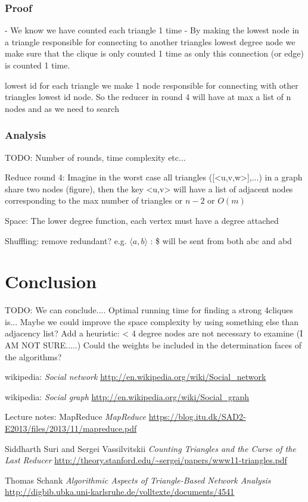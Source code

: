\documentclass{article}
\begin{document}
\subsubsection{Proof}
- We know we have counted each triangle 1 time
- By making the lowest node in a triangle responsible for connecting to another triangles lowest degree node we make sure that the clique is only counted 1 time as only this connection (or edge) is counted 1 time.

lowest id
for each triangle we make 1 node responsible for connecting with other triangles lowest id node. So the reducer in round 4 will have at max a list of n nodes and as we need to search



\subsubsection{Analysis}
TODO: Number of rounds, time complexity etc...

Reduce round 4: Imagine in the worst case all triangles ([<u,v,w>],...) in a graph share two nodes (figure), then the key <u,v> will have a list of adjacent nodes corresponding to the max number of triangles or $n-2$ or $O(m)$

Space: The lower degree function, each vertex must have a degree attached

Shuffling: remove redundant? e.g. $\langle a,b\rangle$ : \$ will be sent from both abc and abd


\section{Conclusion}
TODO: We can conclude....
Optimal running time for finding a strong 4cliques is...
Maybe we could improve the space complexity by using something else than adjacency list?
Add a heuristic: < 4 degree nodes are not necessary to examine (I AM NOT SURE.....)
Could the weights be included in the determination faces of the algorithms?

\begin{thebibliography}{1}

    wikipedia:
    \emph{Social network}
    \url{http://en.wikipedia.org/wiki/Social_network}

    wikipedia:
    \emph{Social graph}
    \url{http://en.wikipedia.org/wiki/Social_graph}

    Lecture notes: MapReduce
    \emph{MapReduce}
    \url{https://blog.itu.dk/SAD2-E2013/files/2013/11/mapreduce.pdf}

    Siddharth Suri and Sergei Vassilvitskii
    \emph{Counting Triangles and the Curse of the Last Reducer}
    \url{http://theory.stanford.edu/~sergei/papers/www11-triangles.pdf}

    Thomas Schank
    \emph{Algorithmic Aspects of Triangle-Based Network Analysis}
    \url{http://digbib.ubka.uni-karlsruhe.de/volltexte/documents/4541}
    
\end{thebibliography}
\end{document}
